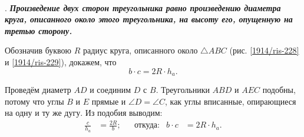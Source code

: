 {\paragraph{}\label{1914/250}. \textbf{\emph{Произведение двух сторон треугольника равно произведению диаметра круга, описанного около этого треугольника, на высоту его, опущенную на третью сторону.}}

Обозначив буквою $R$ радиус круга, описанного около $\triangle ABC$ (рис. \ref{1914/ris-228} и \ref{1914/ris-229}), докажем, что
\[b\cdot c=2R\cdot h_a.\]

Проведём диаметр $AD$ и соединим $D$ с $B$.
Треугольники $ABD$ и $AEC$ подобны, потому что углы $B$ и $E$ прямые и $\angle D=\angle C$, как углы вписанные, опирающиеся на одну и ту же дугу.
Из подобия выводим:
\begin{align*}
\frac{c}{h_a}&=\frac{2R}{b};
&
&\text{откуда:}
&
b\cdot c&=2R\cdot h_a.
\end{align*}

}
